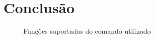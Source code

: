 \documentclass[a4paper,11pt,openright,oneside]{report}
\begin{document}
\section{Conclusão}
\label{sec:conclusão}

\begin{figure}[ht]
\center
{}
\caption{Funções suportadas do comando utilizado}
\label{fig:ir_leds0}
\end{figure}

\maketitle
\nocite{*}
\end{document}
